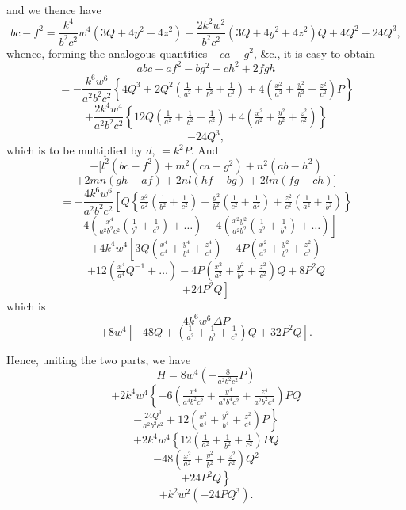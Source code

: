 \documentclass[11pt,a4paper]{article}
\begin{document}
\noindent and we thence have
\[
bc - f^{2} = \frac{k^{4}}{b^{2}c^{2}}w^{4}(3Q + 4y^{2} + 4z^{2}) - \frac{2k^{2}w^{2}}{b^{2}c^{2}}(3Q + 4y^{2} + 4z^{2})Q + 4Q^{2} - 24Q^{3},
\]
whence, forming the analogous quantities $-ca - g^{2}$, \&c., it is easy to obtain
\[
abc - af^{2} - bg^{2} - ch^{2} + 2fgh
\]
\[
= -\frac{k^{6}w^{6}}{a^{2}b^{2}c^{2}}\left\{4Q^{3} + 2Q^{2}\left(\tfrac{1}{a^{2}} + \tfrac{1}{b^{2}} + \tfrac{1}{c^{2}}\right) + 4\left(\tfrac{x^{2}}{a^{2}} + \tfrac{y^{2}}{b^{2}} + \tfrac{z^{2}}{c^{2}}\right)P\right\}
\]
\[
+ \frac{2k^{4}w^{4}}{a^{2}b^{2}c^{2}}\left\{12Q\left(\tfrac{1}{a^{2}} + \tfrac{1}{b^{2}} + \tfrac{1}{c^{2}}\right) + 4\left(\tfrac{x^{2}}{a^{2}} + \tfrac{y^{2}}{b^{2}} + \tfrac{z^{2}}{c^{2}}\right)\right\}
\]
\[
- 24Q^{3},
\]
which is to be multiplied by $d$, $= k^{2}P$. And
\[
- [l^{2}(bc - f^{2}) + m^{2}(ca - g^{2}) + n^{2}(ab - h^{2})
\]
\[
+ 2mn(gh - af) + 2nl(hf - bg) + 2lm(fg - ch)]
\]
\[
= -\frac{4k^{6}w^{6}}{a^{2}b^{2}c^{2}}\left[Q\left\{\tfrac{x^{2}}{a^{2}}\left(\tfrac{1}{b^{2}} + \tfrac{1}{c^{2}}\right) + \tfrac{y^{2}}{b^{2}}\left(\tfrac{1}{c^{2}} + \tfrac{1}{a^{2}}\right) + \tfrac{z^{2}}{c^{2}}\left(\tfrac{1}{a^{2}} + \tfrac{1}{b^{2}}\right)\right\}\right.
\]
\[
\left. + 4\left(\tfrac{x^{4}}{a^{2}b^{2}c^{2}}\left(\tfrac{1}{b^{2}} + \tfrac{1}{c^{2}}\right) + \ldots\right) - 4\left(\tfrac{x^{2}y^{2}}{a^{2}b^{2}}\left(\tfrac{1}{a^{2}} + \tfrac{1}{b^{2}}\right) + \ldots\right)\right]
\]
\[
+ 4k^{4}w^{4}\left[3Q\left(\tfrac{x^{4}}{a^{4}} + \tfrac{y^{4}}{b^{4}} + \tfrac{z^{4}}{c^{4}}\right) - 4P\left(\tfrac{x^{2}}{a^{2}} + \tfrac{y^{2}}{b^{2}} + \tfrac{z^{2}}{c^{2}}\right)\right.
\]
\[
\left. + 12\left(\tfrac{x^{4}}{a^{4}}Q^{-1} + \ldots\right) - 4P\left(\tfrac{x^{2}}{a^{2}} + \tfrac{y^{2}}{b^{2}} + \tfrac{z^{2}}{c^{2}}\right)Q + 8P^{2}Q\right.
\]
\[
\left. + 24P^{2}Q\right]
\]
which is
\[
4k^{6}w^{6}\,\Delta P
\]
\[
+ 8w^{4}\left[-48Q + \left(\tfrac{1}{a^{2}} + \tfrac{1}{b^{2}} + \tfrac{1}{c^{2}}\right)Q + 32P^{2}Q\right].
\]

\newpage


\noindent Hence, uniting the two parts, we have
\[
H = 8w^{4}\left(-\tfrac{8}{a^{2}b^{2}c^{2}}P\right)
\]
\[
+ 2k^{4}w^{4}\left\{- 6\left(\tfrac{x^{4}}{a^{4}b^{2}c^{2}} + \tfrac{y^{4}}{a^{2}b^{4}c^{2}} + \tfrac{z^{4}}{a^{2}b^{2}c^{4}}\right)PQ\right.
\]
\[
\left. - \tfrac{24Q^{3}}{a^{2}b^{2}c^{2}} + 12\left(\tfrac{x^{2}}{a^{4}} + \tfrac{y^{2}}{b^{4}} + \tfrac{z^{2}}{c^{4}}\right)P\right\}
\]
\[
+ 2k^{4}w^{4}\left\{12\left(\tfrac{1}{a^{2}} + \tfrac{1}{b^{2}} + \tfrac{1}{c^{2}}\right)PQ\right.
\]
\[
\left. - 48\left(\tfrac{x^{2}}{a^{2}} + \tfrac{y^{2}}{b^{2}} + \tfrac{z^{2}}{c^{2}}\right)Q^{2}\right.
\]
\[
\left. + 24P^{2}Q\right\}
\]
\[
+ k^{2}w^{2}(-24PQ^{3}).
\]
\end{document}
